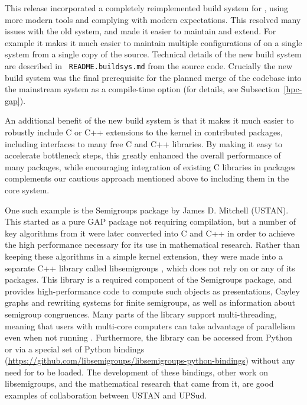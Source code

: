 This release incorporated a completely
reimplemented build system for \GAP, using more modern tools and
complying with modern expectations. This resolved many issues with the
old system, and made it easier to maintain and extend. For example it
makes it much easier to maintain multiple configurations of \GAP on a
single system from a single copy of the source. Technical
details of the new build system are described in {\tt
  README.buildsys.md} from the \GAP source code. Crucially the new build system
was the final prerequisite for the planned  merge of the \HPCGAP codebase  into the
mainstream \GAP system as a compile-time option (for details, see
Subsection~\ref{hpc-gap}).

An additional benefit of the new build system is that it makes it much
easier to robustly include C or C++ extensions to the \GAP kernel in
contributed packages, including interfaces to many free C and C++
libraries. By making it easy to accelerate bottleneck steps, this
greatly enhanced the overall performance of many packages, while
encouraging integration of existing C libraries in packages complements
our cautious approach mentioned above to including them in the core
system.


One such example is the {\sf Semigroups} package \cite{Semigroups} by James D.
Mitchell (USTAN).  This started as a pure GAP package not requiring compilation,
but a number of key algorithms from it were later converted into C and C++ in
order to achieve the high performance necessary for its use in mathematical
research.  Rather than keeping these algorithms in a simple \GAP kernel
extension, they were made into a separate C++ library called {\sf libsemigroups}
\cite{libsemigroups}, which does not rely on \GAP or any of its packages.  This
library is a required component of the {\sf Semigroups} package, and provides
high-performance code to compute such objects as presentations, Cayley graphs
and rewriting systems for finite semigroups, as well as information about
semigroup congruences.  Many parts of the library support multi-threading,
meaning that users with multi-core computers can take advantage of parallelism
even when not running \HPCGAP.  Furthermore, the library can be accessed from
Python or \Sage via a special set of Python bindings
(\url{https://github.com/libsemigroups/libsemigroups-python-bindings}) without
any need for \GAP to be loaded.  The development of these bindings, other work
on {\sf libsemigroups}, and the mathematical research that came from it, are
good examples of \ODK collaboration between USTAN and UPSud.


